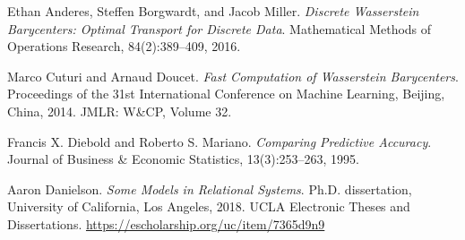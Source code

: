 Ethan Anderes, Steffen Borgwardt, and Jacob Miller.
\textit{Discrete Wasserstein Barycenters: Optimal Transport for Discrete Data}.
Mathematical Methods of Operations Research, 84(2):389--409, 2016.

Marco Cuturi and Arnaud Doucet.
\textit{Fast Computation of Wasserstein Barycenters}.
Proceedings of the 31st International Conference on Machine Learning,
Beijing, China, 2014. JMLR: W\&CP, Volume 32.

Francis X. Diebold and Roberto S. Mariano.
\textit{Comparing Predictive Accuracy}.
Journal of Business \& Economic Statistics, 13(3):253--263, 1995.

Aaron Danielson.
\textit{Some Models in Relational Systems}.
Ph.D. dissertation, University of California, Los Angeles, 2018.
UCLA Electronic Theses and Dissertations.
\url{https://escholarship.org/uc/item/7365d9n9}
